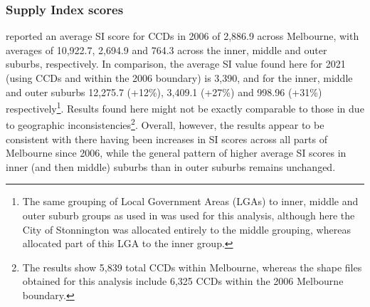 \documentclass[preprint, 3p,
authoryear]{elsarticle} %
\begin{document}
\subsubsection{Supply Index scores}\label{supply-index-scores}

\citet{currie2010identifying} reported an average SI score for CCDs in
2006 of 2,886.9 across Melbourne, with averages of 10,922.7, 2,694.9 and
764.3 across the inner, middle and outer suburbs, respectively. In
comparison, the average SI value found here for 2021 (using CCDs and
within the 2006 boundary) is 3,390, and for the inner, middle and outer
suburbs 12,275.7 (+12\%), 3,409.1 (+27\%) and 998.96 (+31\%)
respectively\footnote{The same grouping of Local Government Areas (LGAs)
  to inner, middle and outer suburb groups as used in
  \citet{currie2010identifying} was used for this analysis, although
  here the City of Stonnington was allocated entirely to the middle
  grouping, whereas \citet{currie2010identifying} allocated part of this
  LGA to the inner group.}. Results found here might not be exactly
comparable to those in \citet{currie2010identifying} due to geographic
inconsistencies\footnote{The \citet{currie2010identifying} results show
  5,839 total CCDs within Melbourne, whereas the shape files obtained
  for this analysis include 6,325 CCDs within the 2006 Melbourne
  boundary.}. Overall, however, the results appear to be consistent with
there having been increases in SI scores across all parts of Melbourne
since 2006, while the general pattern of higher average SI scores in
inner (and then middle) suburbs than in outer suburbs remains unchanged.
\end{document}
